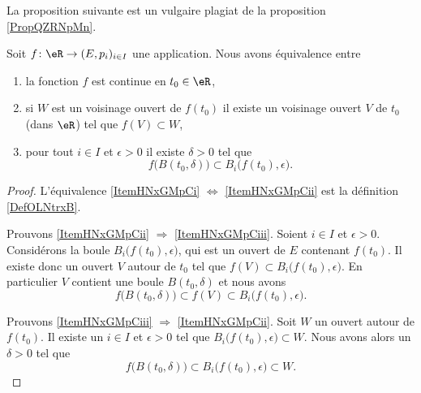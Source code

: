 La proposition suivante est un vulgaire plagiat de la proposition \ref{PropQZRNpMn}.
\begin{proposition} \label{PropNGjQnqF}
    Soit \( f\colon \eR\to (E,p_i)_{i\in I}\) une application. Nous avons équivalence entre
    \begin{enumerate}
        \item   \label{ItemHNxGMpCi}
            la fonction \( f\) est continue en \( t_0\in \eR\),
        \item\label{ItemHNxGMpCii}
            si \( W\) est un voisinage ouvert de \( f(t_0)\) il existe un voisinage ouvert \( V\) de \( t_0\) (dans \( \eR\)) tel que \( f(V)\subset W\),
        \item\label{ItemHNxGMpCiii}
            pour tout \( i\in I\) et \( \epsilon>0\) il existe \( \delta>0\) tel que
            \begin{equation}
                f\big( B(t_0,\delta) \big)\subset B_i\big( f(t_0),\epsilon \big).
            \end{equation}
    \end{enumerate}
\end{proposition}

\begin{proof}
    L'équivalence \ref{ItemHNxGMpCi} \( \Leftrightarrow\) \ref{ItemHNxGMpCii} est la définition \ref{DefOLNtrxB}.

    Prouvons \ref{ItemHNxGMpCii} \( \Rightarrow\) \ref{ItemHNxGMpCiii}. Soient \( i\in I\) et \( \epsilon>0\). Considérons la boule \( B_i\big( f(t_0),\epsilon \big)\), qui est un ouvert de \( E\) contenant \( f(t_0)\). Il existe donc un ouvert \( V\) autour de \( t_0\) tel que \( f(V)\subset B_i\big( f(t_0),\epsilon \big)\). En particulier \( V\) contient une boule \( B(t_0,\delta)\) et nous avons
    \begin{equation}
        f\big( B(t_0,\delta) \big)\subset f(V)\subset B_i\big( f(t_0),\epsilon \big).
    \end{equation}

    Prouvons \ref{ItemHNxGMpCiii} \( \Rightarrow\) \ref{ItemHNxGMpCii}. Soit \( W\) un ouvert autour de \( f(t_0)\). Il existe un \( i\in I\) et \( \epsilon>0\) tel que \( B_i\big( f(t_0),\epsilon \big)\subset W\). Nous avons alors un \( \delta>0\) tel que
    \begin{equation}
        f\big( B(t_0,\delta) \big)\subset B_i\big( f(t_0),\epsilon \big)\subset W.
    \end{equation}
\end{proof}

